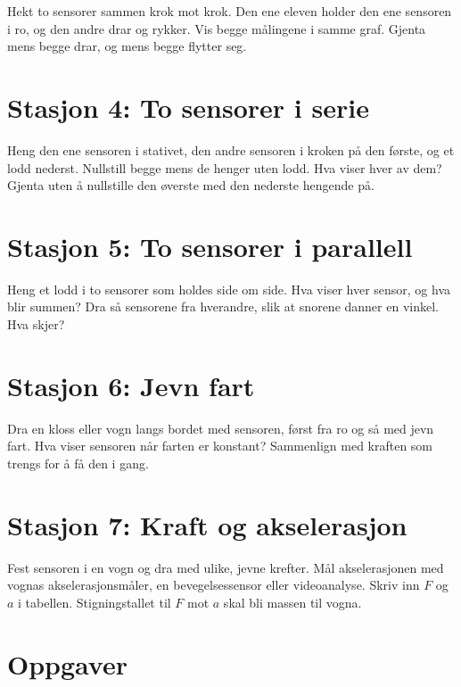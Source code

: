 \documentclass[11pt]{article}
\begin{document}
Hekt to sensorer sammen krok mot krok. Den ene eleven holder den ene sensoren i ro, og den andre drar og rykker. Vis begge målingene i samme graf. Gjenta mens begge drar, og mens begge flytter seg.

\section*{Stasjon 4: To sensorer i serie}

Heng den ene sensoren i stativet, den andre sensoren i kroken på den første, og et lodd nederst. Nullstill begge mens de henger uten lodd. Hva viser hver av dem? Gjenta uten å nullstille den øverste med den nederste hengende på.

\section*{Stasjon 5: To sensorer i parallell}

Heng et lodd i to sensorer som holdes side om side. Hva viser hver sensor, og hva blir summen? Dra så sensorene fra hverandre, slik at snorene danner en vinkel. Hva skjer?

\section*{Stasjon 6: Jevn fart}

Dra en kloss eller vogn langs bordet med sensoren, først fra ro og så med jevn fart. Hva viser sensoren når farten er konstant? Sammenlign med kraften som trengs for å få den i gang.

\section*{Stasjon 7: Kraft og akselerasjon}

Fest sensoren i en vogn og dra med ulike, jevne krefter. Mål akselerasjonen med vognas akselerasjonsmåler, en bevegelsessensor eller videoanalyse. Skriv inn $F$ og $a$ i tabellen. Stigningstallet til $F$ mot $a$ skal bli massen til vogna.

\section*{Oppgaver}
\end{document}
